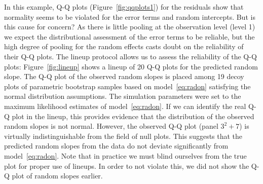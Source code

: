 \documentclass[12pt]{article} %
\begin{document}
In this example, Q-Q plots (Figure~\ref{fig:qqplots1}) for the residuals show that normality 
seems to be violated for the error terms and random intercepts. But is this cause for concern?
As there is little pooling at the observation level (level 1) we expect the distributional assessment of the error terms to be reliable, but  the high degree of pooling  for the random effects  casts doubt on the reliability of their Q-Q plots. The lineup protocol  \citep{buja:2009} allows us to assess the reliability of the Q-Q plots:
Figure~\ref{fig:lineup} shows a lineup of 20 Q-Q plots for the predicted random slope. The Q-Q plot of the observed random slopes is placed among 19 decoy plots of parametric bootstrap samples based on model~\eqref{eq:radon} satisfying the normal distribution assumptions. The simulation parameters were set to the maximum likelihood estimates of model~\eqref{eq:radon}. 
If we can identify the real Q-Q plot in the lineup, this provides evidence that the distribution of the observed random slopes is not normal. However, 
the observed Q-Q plot (panel $3^2+7$) is virtually indistinguishable from the field of null plots. This suggests that the predicted random slopes  from the data do not deviate significantly from model~\eqref{eq:radon}.  
Note that in practice we must blind ourselves from the true plot for proper use of lineups. In order to not violate this, we did not show the Q-Q plot of random slopes earlier.
\end{document}

